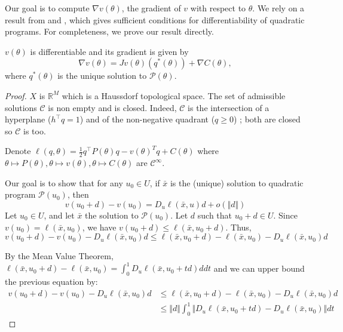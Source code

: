 Our goal is to compute $\nabla v(\theta)$, the gradient of $v$ with respect to $\theta$. We rely on a result from \cite{shapiro} and \cite{lee}, which gives sufficient conditions for differentiability of quadratic programs. For completeness, we prove our result directly.

\begin{theorem}
    $v(\theta)$ is differentiable and its gradient is given by
    \begin{equation}
        \nabla v(\theta) = Jv(\theta)(q^*(\theta)) + \nabla C(\theta),
    \end{equation} where $q^*(\theta)$ is the unique solution to $\mathcal P(\theta)$.
\end{theorem}

\begin{proof}
    $X$ is $\mathbb R^M$ which is a Haussdorf topological space. The set of admissible solutions $\mathcal C$ is non empty and is closed. Indeed, $\mathcal C$ is the intersection of a hyperplane ($h^\top q=1$) and of the non-negative quadrant ($q \geq 0$) ; both are closed so $\mathcal C$ is too.

    Denote $\ell(q, \theta) = \frac{1}{2}q^\top P(\theta) q - v(\theta)^Tq + C(\theta)$ where $\theta \mapsto P(\theta), \theta \mapsto v(\theta), \theta \mapsto C(\theta)$ are $\mathcal C^\infty$.

   Our goal is to show that for any $u_0\in U$, if $\bar x$ is the (unique) solution to quadratic program $\mathcal P(u_0)$, then
   \begin{equation}\label{eq:goal}
       v(u_0 + d) - v(u_0) = D_u \ell(\bar x, u)d + o\left(\Vert d\Vert\right)
   \end{equation}
   Let $u_0 \in U$, and let $\bar x$ the solution to $\mathcal P(u_0)$. Let $d$ such that $u_0 + d \in U$. Since $v(u_0) = \ell(\bar x, u_0)$, we have $v(u_0+d) \leq \ell(\bar x, u_0 + d)$. Thus,
   \begin{equation}
       v(u_0 + d) - v(u_0) - D_u\ell(\bar x, u_0)d \leq \ell(\bar x, u_0 + d) - \ell(\bar x, u_0) - D_u \ell(\bar x, u_0)d
   \end{equation}

    By the Mean Value Theorem, $\ell(\bar x, u_0 + d) - \ell(\bar x, u_0) = \int_0^1 D_u\ell(\bar x, u_0 + td)ddt$ and we can upper bound the previous equation by:
   \begin{align}
       v(u_0 + d) - v(u_0) - D_u\ell(\bar x, u_0)d&\leq \ell(\bar x, u_0 + d) - \ell(\bar x, u_0) - D_u \ell(\bar x, u_0)d\\
        &\leq \Vert d\Vert \int_0^1 \Vert D_u\ell(\bar x, u_0 +td) - D_u\ell(\bar x, u_0)\Vert dt
   \end{align}


\end{proof}
